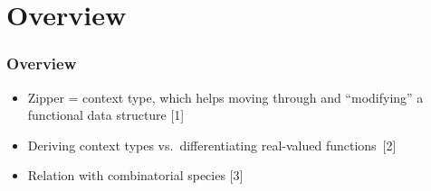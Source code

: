 \section{Overview}

\begin{frame}
\frametitle{Overview}

\begin{itemize}[<+->]
\item Zipper = context type, which helps moving through and ``modifying'' a functional data structure [1]
\item Deriving context types vs.\ differentiating real-valued \mbox{functions [2]}
\item Relation with combinatorial species [3]
\end{itemize}
\end{frame}